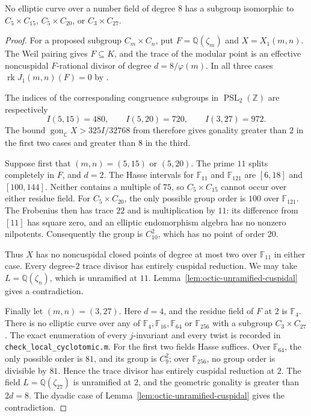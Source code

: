 \begin{proposition}\label{prop:octic-local-mixed-exclusions}
No elliptic curve over a number field of degree $8$ has a
subgroup isomorphic to $C_5\times C_{15}$,
$C_5\times C_{20}$, or $C_3\times C_{27}$.
\end{proposition}
\begin{proof}
For a proposed subgroup $C_m\times C_n$, put
$F=\mathbb Q(\zeta_m)$ and $X=X_1(m,n)$. The Weil pairing
gives $F\subseteq K$, and the trace of the modular point is an
effective noncuspidal $F$-rational divisor of degree
$d=8/\varphi(m)$. In all three cases
$\operatorname{rk}J_1(m,n)(F)=0$ by
\cite[Theorem~4.1]{DS}.

The indices of the corresponding congruence subgroups in
$\operatorname{PSL}_2(\mathbb Z)$ are respectively
\[
 I(5,15)=480,\qquad I(5,20)=720,\qquad I(3,27)=972.
\]
The bound $\operatorname{gon}_{\mathbb C}X>325I/32768$ from
\cite[Proposition~2.1]{DS}
therefore gives gonality greater than $2$ in the first two
cases and greater than $8$ in the third.

Suppose first that $(m,n)=(5,15)$ or $(5,20)$. The prime $11$
splits completely in $F$, and $d=2$. The Hasse intervals for
$\mathbb F_{11}$ and $\mathbb F_{121}$ are $[6,18]$ and
$[100,144]$. Neither contains a multiple of $75$, so
$C_5\times C_{15}$ cannot occur over either residue field.
For $C_5\times C_{20}$, the only possible group order is $100$
over $\mathbb F_{121}$. The Frobenius then has trace $22$ and
is multiplication by $11$: its difference from $[11]$ has
square zero, and an elliptic endomorphism algebra has no
nonzero nilpotents. Consequently the group is $C_{10}^2$,
which has no point of order $20$.

Thus $X$ has no noncuspidal closed points of degree at most two
over $\mathbb F_{11}$ in either case. Every degree-$2$ trace
divisor has entirely cuspidal reduction. We may take
$L=\mathbb Q(\zeta_n)$, which is unramified at $11$.
Lemma~\ref{lem:octic-unramified-cuspidal} gives a contradiction.

Finally let $(m,n)=(3,27)$. Here $d=4$, and the residue field
of $F$ at $2$ is $\mathbb F_4$. There is no elliptic curve
over any of $\mathbb F_4,\mathbb F_{16},\mathbb F_{64}$ or
$\mathbb F_{256}$ with a subgroup $C_3\times C_{27}$.
The exact enumeration of every $j$-invariant and every twist
is recorded in \texttt{check\_local\_cyclotomic.m}.
For the first two fields Hasse suffices. Over $\mathbb F_{64}$,
the only possible order is $81$, and its group is $C_9^2$;
over $\mathbb F_{256}$, no group order is divisible by $81$.
Hence the trace divisor has entirely cuspidal reduction at $2$.
The field $L=\mathbb Q(\zeta_{27})$ is unramified at $2$, and
the geometric gonality is greater than $2d=8$.
The dyadic case of Lemma~\ref{lem:octic-unramified-cuspidal}
gives the contradiction.
\end{proof}


